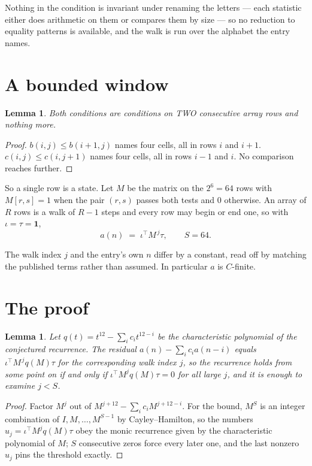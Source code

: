 \documentclass[11pt,a4paper]{article}
\theoremstyle{plain}
\newtheorem{lemma}[theorem]{Lemma}
\theoremstyle{definition}
\begin{document}
Nothing in the condition is invariant under renaming the letters --- each statistic either does
arithmetic on them or compares them by size --- so no reduction to equality patterns is
available, and the walk is run over the alphabet the entry names.

\section{A bounded window}

\begin{lemma}\label{lem:win}
Both conditions are conditions on TWO consecutive array rows and nothing more.
\end{lemma}

\begin{proof}
$b(i,j)\le b(i{+}1,j)$ names four cells, all in rows $i$ and $i+1$. $c(i,j)\le c(i,j{+}1)$
names four cells, all in rows $i-1$ and $i$. No comparison reaches further.
\end{proof}

So a single row is a state. Let $M$ be the matrix on the $2^{6}=64$ rows with
$M[r,s]=1$ when the pair $(r,s)$ passes both tests and $0$ otherwise. An array of $R$ rows is a
walk of $R-1$ steps and every row may begin or end one, so with $\iota=\tau=\mathbf{1}$,
\[
a(n)\;=\;\iota^{\!\top}M^{\,j}\tau ,\qquad S=64.
\]

The walk index $j$ and the entry's own $n$ differ by a constant, read off by matching the
published terms rather than assumed. In particular $a$ is $C$-finite.

\section{The proof}

\begin{lemma}\label{lem:crit}
Let $q(t)=t^{12}-\sum_i c_it^{12-i}$ be the characteristic polynomial of the
conjectured recurrence. The residual $a(n)-\sum_ic_ia(n-i)$ equals
$\iota^{\!\top}M^{\,j}q(M)\tau$ for the corresponding walk index $j$, so the recurrence
holds from some point on if and only if $\iota^{\!\top}M^{j}q(M)\tau=0$ for all large $j$,
and it is enough to examine $j<S$.
\end{lemma}

\begin{proof}
Factor $M^{j}$ out of $M^{j+12}-\sum_ic_iM^{j+12-i}$. For the bound, $M^{S}$
is an integer combination of $I,M,\dots,M^{S-1}$ by Cayley--Hamilton, so the numbers
$u_j=\iota^{\!\top}M^{j}q(M)\tau$ obey the monic recurrence given by the characteristic
polynomial of $M$; $S$ consecutive zeros force every later one, and the last nonzero $u_j$
pins the threshold exactly.
\end{proof}
\end{document}
